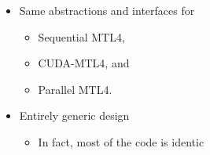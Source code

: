 \begin{frame}
  \begin{itemize}
  \item Same abstractions and interfaces for
    \begin{itemize}
    \item Sequential MTL4,
    \item CUDA-MTL4, and
    \item Parallel MTL4.
    \end{itemize}
  \item Entirely generic design
    \begin{itemize}
    \item In fact, most of the code is identic
    \end{itemize}


  \end{itemize}

\end{frame}

\begin{frame}
  
\end{frame}